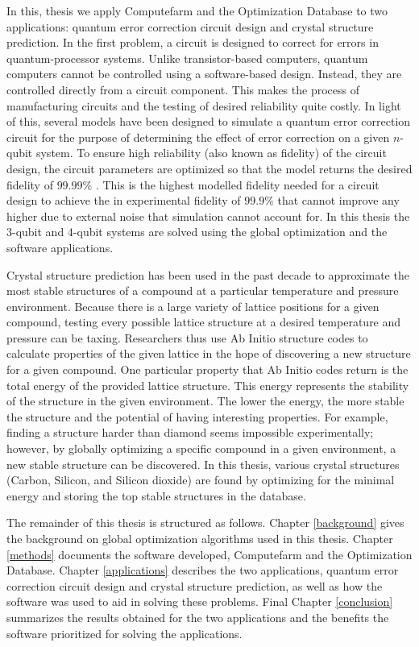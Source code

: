 In this, thesis we apply Computefarm and the Optimization Database to two applications: quantum error correction circuit design and crystal structure prediction. In the first problem, a circuit is designed to correct for errors in quantum-processor systems. Unlike transistor-based computers, quantum computers cannot be controlled using a software-based design. Instead, they are controlled directly from a circuit component. This makes the process of manufacturing circuits and the testing of
desired reliability quite costly. In light of this, several models have been designed to simulate a quantum error correction circuit for the purpose of determining the effect of error correction on a given $n$-qubit system. To ensure high reliability (also known as fidelity) of the circuit design, the circuit parameters are optimized so that the model returns the desired fidelity of $99.99\%$ \cite{Barends2014,Ghosh2013}. This is the highest modelled fidelity needed for a circuit design
to achieve the in experimental fidelity of  $99.9\%$ that cannot improve any higher due to external noise that simulation cannot account for. In this thesis the $3$-qubit and $4$-qubit systems are solved using the global optimization and the software applications.

Crystal structure prediction has been used in the past decade to approximate the most stable structures of a compound at a particular temperature and pressure environment. Because there is a large variety of lattice positions for a given compound, testing every possible lattice structure at a desired temperature and pressure can be taxing. Researchers thus use Ab Initio structure codes to calculate properties of the given lattice in the hope of discovering a new structure for a given compound.
One particular property that Ab Initio codes return is the total energy of the provided lattice structure. This energy represents the stability of the structure in the given environment. The lower the energy, the more stable the structure and the potential of having interesting properties. For example, finding a structure harder than diamond seems impossible experimentally; however, by globally optimizing a specific compound in a given environment, a new stable structure can be discovered. In
this thesis, various crystal structures (Carbon, Silicon, and Silicon dioxide) are found by optimizing for the minimal energy and storing the top stable structures in the database.  

The remainder of this thesis is structured as follows. Chapter \ref{background} gives the background on global optimization algorithms used in this thesis. Chapter \ref{methods} documents the software developed, Computefarm and the Optimization Database. Chapter \ref{applications} describes the two applications, quantum error correction circuit design and crystal structure prediction, as well as how the software was used to aid in
solving these problems. Final Chapter \ref{conclusion} summarizes the results obtained for the two applications and the benefits the software prioritized for solving the applications.

